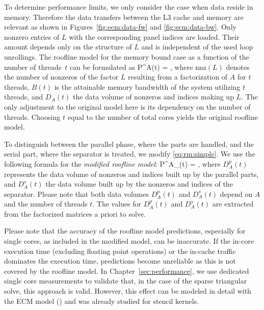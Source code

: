 To determine performance limits, we only consider the case when data reside in
memory.
Therefore the data transfers between the L3 cache and memory are relevant as shown
in Figures~\ref{fig:ecm:data-fw} and \ref{fig:ecm:data-bw}.
Only nonzero entries of $L$ with the corresponding panel indices are loaded. 
Their amount depends only on the structure of $L$ and is independent of the used
loop unrollings.
%
The roofline model for the memory bound case as a function of the number of
threads~$t$ can be formulated as
%
\be
  \label{eq:rm:simple}
  P^{A}(t)
  =  \quad {},
\ee
%
where $\text{nnz}(L)$ denotes the number of nonzeros of the factor $L$ 
resulting from a factorization of $A$ for $t$ threads, 
$B(t)$ is the attainable memory bandwidth of the system utilizing $t$ threads, and 
$D_A(t)$ the data volume of nonzeros and indices making up $L$.
The only adjustment to the original model here is its dependency on the number
of threads. 
Choosing $t$ equal to the number of total cores yields the original roofline model.

To distinguish between the parallel phase, where the parts are handled,
and the serial part, where the separator is treated, we modify 
\eqref{eq:rm:simple}.
We use the following formula for the \textit{modified roofline model}: 
%
\be
  \label{eq:rm:mod}
  P^{A}_{}(t) 
  =  \quad {},
\ee
%
where
$D_A^p(t)$ 
represents
the data volume of nonzeros and indices %
built up
by the parallel parts, and $D_A^s(t)$ the data volume %
built up by the nonzeros and
indices of the separator.
%
Please note that both data volumes $D_A^p(t)$ and $D_A^s(t)$ depend on
$A$ and the number of threads $t$.
%
The values for $D_A^p(t)$ and $D_A^s(t)$ are extracted from the factorized
matrices a priori to solve.

Please note that the accuracy of the roofline model predictions, especially for
single cores, as included in the modified model, can be inaccurate. 
If the in-core execution time (excluding floating point operations) or the in-cache
traffic dominates the execution time, predictions become unreliable as this is not
covered by the roofline model.
In Chapter~\ref{sec:performance}, we use dedicated single core measurements to
validate that, in the case of the sparse triangular solve,
this approach is valid. 
%
However, this effect can be modeled in detail with the ECM
model (\cite{treibig-2010-ecm, hager-2012-ecm, stengel-2015}) and was already
studied for stencil kernels.


